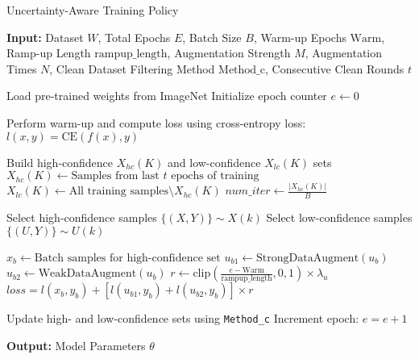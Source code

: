 \documentclass[preprint,12pt,authoryear]{elsarticle}
\begin{document}
\begin{algorithm}[H]
\caption{Uncertainty-Aware Training Policy}
\label{alg:training_procedure}
\begin{algorithmic}[0]
    \State \textbf{Input:} Dataset $W$, Total Epochs $E$, Batch Size $B$, Warm-up Epochs $\text{Warm}$, Ramp-up Length $\text{rampup\_length}$, Augmentation Strength $M$, Augmentation Times $N$, Clean Dataset Filtering Method $\text{Method\_c}$, Consecutive Clean Rounds $t$

    \State Load pre-trained weights from ImageNet
    \State Initialize epoch counter $e \gets 0$
    
    
            \State Perform warm-up and compute loss using cross-entropy loss: $l(x, y) = \text{CE}(f(x), y)$
        \EndFor
    
            \State Build high-confidence $X_{hc}(K)$ and low-confidence $X_{lc}(K)$ sets
            \State $X_{hc}(K) \gets \text{Samples from last } t \text{ epochs of training}$
            \State $X_{lc}(K) \gets \text{All training samples} \setminus X_{hc}(K)$
            \State $num\_iter \gets \frac{|X_{hc}(K)|}{B}$
    
                \State Select high-confidence samples $\{(X, Y)\} \sim X(k)$
                \State Select low-confidence samples $\{(U, Y)\} \sim U(k)$
    
                    \State $x_b  \gets \text{Batch samples for high-confidence set}$
                    \State $u_{b1} \gets  \text{StrongDataAugment}(u_b)$
                    \State $u_{b2} \gets  \text{WeakDataAugment}(u_b)$
                    \State $r \gets \text{clip}\left(\frac{e - \text{Warm}}{\text{rampup\_length}}, 0, 1\right) \times \lambda_u$
                    \State $loss = l(x_b, y_b) + [l(u_{b1}, y_b) + l(u_{b2}, y_b)] \times r$
                \EndFor
            \EndFor
        \EndIf
        
        \State Update high- and low-confidence sets using \texttt{Method\_c}
        \State Increment epoch: $e = e + 1$
    \EndWhile
    
    \State \textbf{Output:} Model Parameters $\theta$
\end{algorithmic}
\end{algorithm}
\end{document}
